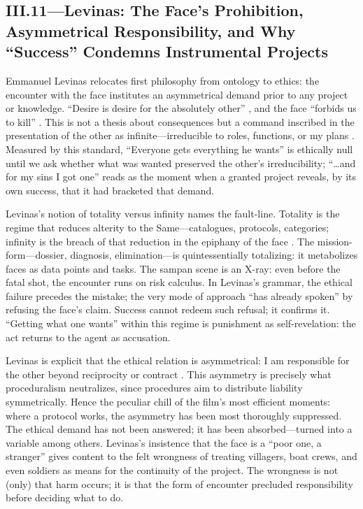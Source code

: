 \subsection*{III.11—Levinas: The Face's Prohibition, Asymmetrical Responsibility, and Why
	``Success'' Condemns Instrumental Projects}
\label{ssec:iii-levinas}
Emmanuel Levinas relocates first philosophy from ontology to ethics: the encounter with the face
institutes an asymmetrical demand prior to any project or knowledge. ``Desire is desire for the
absolutely other'' \parencite[p.~33]{LevinasTI1969}, and the face ``forbids us to kill''
\parencite[p.~199]{LevinasTI1969}. This is not a thesis about consequences but a command
inscribed in the presentation of the other as infinite—irreducible to roles, functions, or my
plans \parencite[pp.~194--201]{LevinasTI1969}. Measured by this standard, ``Everyone gets
everything he wants'' is ethically null until we ask whether what was wanted preserved the
other's irreducibility; ``\ldots and for my sins I got one'' reads as the moment when a granted
project reveals, by its own success, that it had bracketed that demand.

Levinas's notion of totality versus infinity names the fault-line. Totality is the regime that
reduces alterity to the Same—catalogues, protocols, categories; infinity is the breach of that
reduction in the epiphany of the face \parencite[pp.~21--24, 33--36]{LevinasTI1969}. The
mission-form—dossier, diagnosis, elimination—is quintessentially totalizing: it metabolizes
faces as data points and tasks. The sampan scene is an X-ray: even before the fatal shot, the
encounter runs on risk calculus. In Levinas's grammar, the ethical failure precedes the mistake;
the very mode of approach ``has already spoken'' by refusing the face's claim. Success cannot
redeem such refusal; it confirms it. ``Getting what one wants'' within this regime is punishment
as self-revelation: the act returns to the agent as accusation.

Levinas is explicit that the ethical relation is asymmetrical: I am responsible for the other
beyond reciprocity or contract \parencite[pp.~215--219]{LevinasTI1969}. This asymmetry is
precisely what proceduralism neutralizes, since procedures aim to distribute liability
symmetrically. Hence the peculiar chill of the film's most efficient moments: where a protocol
works, the asymmetry has been most thoroughly suppressed. The ethical demand has not been
answered; it has been absorbed—turned into a variable among others. Levinas's insistence that
the face is a ``poor one, a stranger'' \parencite[p.~213]{LevinasTI1969} gives content to the
felt wrongness of treating villagers, boat crews, and even soldiers as means for the continuity
of the project. The wrongness is not (only) that harm occurs; it is that the form of encounter
precluded responsibility before deciding what to do.

